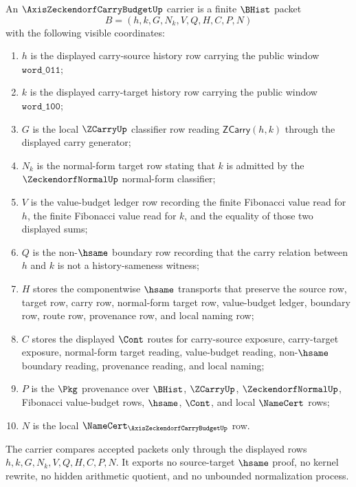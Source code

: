 \begin{definition}
\label{def:axis-zeckendorf-carry-budget-carrier}
An $\AxisZeckendorfCarryBudgetUp$ carrier is a finite $\BHist$ packet
$$
B=(h,k,G,N_k,V,Q,H,C,P,N)
$$
with the following visible coordinates:
\begin{enumerate}
\item $h$ is the displayed carry-source history row carrying the public window $\mathtt{word\_011}$;
\item $k$ is the displayed carry-target history row carrying the public window $\mathtt{word\_100}$;
\item $G$ is the local $\ZCarryUp$ classifier row reading $\mathsf{ZCarry}(h,k)$ through the displayed carry generator;
\item $N_k$ is the normal-form target row stating that $k$ is admitted by the $\ZeckendorfNormalUp$ normal-form classifier;
\item $V$ is the value-budget ledger row recording the finite Fibonacci value read for $h$, the finite Fibonacci value read for $k$, and the equality of those two displayed sums;
\item $Q$ is the non-$\hsame$ boundary row recording that the carry relation between $h$ and $k$ is not a history-sameness witness;
\item $H$ stores the componentwise $\hsame$ transports that preserve the source row, target row, carry row, normal-form target row, value-budget ledger, boundary row, route row, provenance row, and local naming row;
\item $C$ stores the displayed $\Cont$ routes for carry-source exposure, carry-target exposure, normal-form target reading, value-budget reading, non-$\hsame$ boundary reading, provenance reading, and local naming;
\item $P$ is the $\Pkg$ provenance over $\BHist$, $\ZCarryUp$, $\ZeckendorfNormalUp$, Fibonacci value-budget rows, $\hsame$, $\Cont$, and local $\NameCert$ rows;
\item $N$ is the local $\NameCert_{\AxisZeckendorfCarryBudgetUp}$ row.
\end{enumerate}
The carrier compares accepted packets only through the displayed rows $h,k,G,N_k,V,Q,H,C,P,N$. It exports no source-target $\hsame$ proof, no kernel rewrite, no hidden arithmetic quotient, and no unbounded normalization process.
\end{definition}

